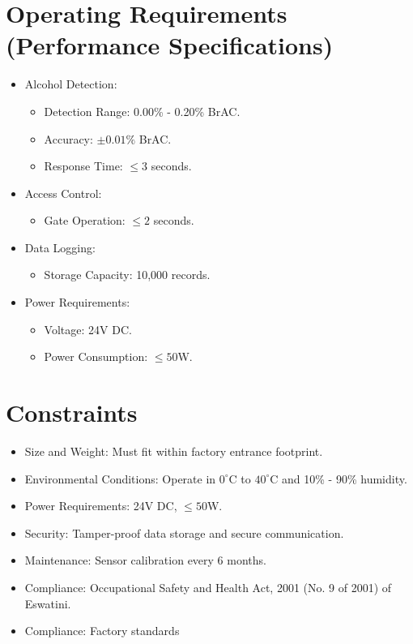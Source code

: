 \documentclass[12pt]{article}
\begin{document}
    \section{Operating Requirements (Performance Specifications)}
    \label{sec:operating_requirements}
    \begin{itemize}
        \item Alcohol Detection:
        \begin{itemize}
            \item Detection Range: 0.00\% - 0.20\% BrAC.
            \item Accuracy: $\pm 0.01\%$ BrAC.
            \item Response Time: $\leq 3$ seconds.
        \end{itemize}
        \item Access Control:
        \begin{itemize}
            \item Gate Operation: $\leq 2$ seconds.
        \end{itemize}
        \item Data Logging:
        \begin{itemize}
            \item Storage Capacity: 10,000 records.
        \end{itemize}
        \item Power Requirements:
        \begin{itemize}
            \item Voltage: 24V DC.
            \item Power Consumption: $\leq 50$W.
        \end{itemize}
    \end{itemize}

    \section{Constraints}
    \label{sec:constraints}
    \begin{itemize}
        \item Size and Weight: Must fit within factory entrance footprint.
        \item Environmental Conditions: Operate in $0^\circ$C to $40^\circ$C and 10\% - 90\% humidity.
        \item Power Requirements: 24V DC, $\leq 50$W.
        \item Security: Tamper-proof data storage and secure communication.
        \item Maintenance: Sensor calibration every 6 months.
        \item Compliance: Occupational Safety and Health Act, 2001 (No. 9 of 2001) of Eswatini.
        \item Compliance: Factory standards
    \end{itemize}
\end{document}
